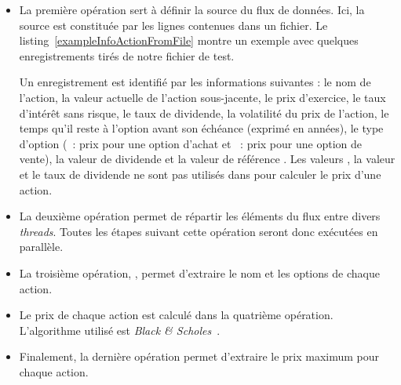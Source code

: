 \begin{itemize}

\item La premi\`ere op\'eration sert \`a d\'efinir la source du flux de donn\'ees. Ici, la source est constitu\'ee par les lignes contenues dans un fichier. Le listing~\ref{exampleInfoActionFromFile} montre un exemple avec quelques enregistrements tir\'es de notre fichier de test. 

Un enregistrement est identifi\'e par les informations suivantes : le nom de l'action, la valeur actuelle de l'action sous-jacente, le prix d'exercice, le taux d'int\'er\^et sans risque, le taux de dividende, la volatilit\'e du prix de l'action, le temps qu'il reste \`a l'option avant son \'ech\'eance (exprim\'e en ann\'ees), le type d'option (~: prix pour une option d'achat et ~: prix pour une option de vente), la valeur de dividende et la valeur de r\'ef\'erence . 
Les valeurs , la valeur et le taux de dividende ne sont pas utilis\'es dans  pour calculer le prix d'une action.




\item La deuxi\`eme op\'eration permet de r\'epartir les \'el\'ements du flux entre divers \emph{threads}.
Toutes les \'etapes suivant cette op\'eration seront donc ex\'ecut\'ees en parall\`ele.

\item La troisi\`eme op\'eration,  , permet d'extraire le nom et les options de chaque action.



\item  Le prix de chaque action est calcul\'e dans la quatri\`eme op\'eration. L'algorithme utilis\'e est \emph{Black \& Scholes}~\cite{macbeth1979empirical}. 

\item Finalement, la derni\`ere op\'eration permet d'extraire le prix maximum pour chaque action.


\end{itemize}

